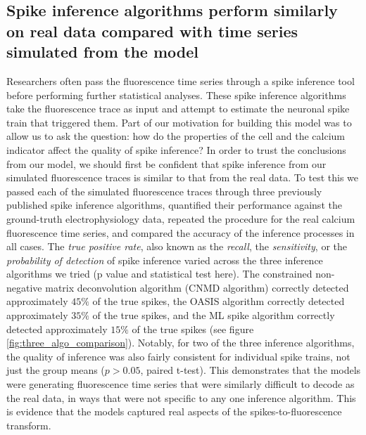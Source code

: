 \documentclass[a4paper,12pt]{article}
\theoremstyle{definition}
\begin{document}
\subsection{Spike inference algorithms perform similarly on real data compared with time series simulated from the model}
Researchers often pass the fluorescence time series through a spike inference tool before performing further statistical analyses. These spike inference algorithms take the fluorescence trace as input and attempt to estimate the neuronal spike train that triggered them\cite{vogelstein, pnevmatikakis, friedrich, paninski1, paninski2, deneux}. Part of our motivation for building this model was to allow us to ask the question: how do the properties of the cell and the calcium indicator affect the quality of spike inference? In order to trust the conclusions from our model, we should first be confident that spike inference from our simulated fluorescence traces is similar to that from the real data. To test this we passed each of the simulated fluorescence traces through three previously published spike inference algorithms, quantified their performance against the ground-truth electrophysiology data, repeated the procedure for the real calcium fluorescence time series, and compared the accuracy of the inference processes in all cases. The \textit{true positive rate}, also known as the \textit{recall}, the \textit{sensitivity}, or the \textit{probability of detection} of spike inference varied across the three inference algorithms we tried (p value and statistical test here). The constrained non-negative matrix deconvolution algorithm \cite{pnevmatikakis} (CNMD algorithm) correctly detected approximately $45\%$ of the true spikes, the OASIS algorithm \cite{friedrich} correctly detected approximately $35\%$ of the true spikes, and the ML spike algorithm \cite{deneux} correctly detected approximately $15\%$ of the true spikes (see figure \ref{fig:three_algo_comparison}). Notably, for two of the three inference algorithms, the quality of inference was also fairly consistent for individual spike trains, not just the group means ($p > 0.05$, paired t-test). This demonstrates that the models were generating fluorescence time series that were similarly difficult to decode as the real data, in ways that were not specific to any one inference algorithm. This is evidence that the models captured real aspects of the spikes-to-fluorescence transform.
\end{document}
